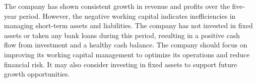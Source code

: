 The company has shown consistent growth in revenue and profits over the five-year period. However, the negative working capital indicates inefficiencies in managing short-term assets and liabilities. The company has not invested in fixed assets or taken any bank loans during this period, resulting in a positive cash flow from investment and a healthy cash balance. The company should focus on improving its working capital management to optimize its operations and reduce financial risk. It may also consider investing in fixed assets to support future growth opportunities.